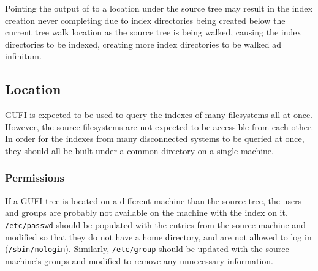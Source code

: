 Pointing the output of \gufidirindex to a location under the source
tree may result in the index creation never completing due to index
directories being created below the current tree walk location as the
source tree is being walked, causing the index directories to be
indexed, creating more index directories to be walked ad infinitum.




\subsection{Location}
GUFI is expected to be used to query the indexes of many filesystems
all at once. However, the source filesystems are not expected to be
accessible from each other. In order for the indexes from many
disconnected systems to be queried at once, they should all be built
under a common directory on a single machine.

\subsubsection{Permissions}
If a GUFI tree is located on a different machine than the source
tree, the users and groups are probably not available on the machine
with the index on it. \texttt{/etc/passwd} should be populated with
the entries from the source machine and modified so that they do not
have a home directory, and are not allowed to log in
(\texttt{/sbin/nologin}). Similarly, \texttt{/etc/group} should be
updated with the source machine's groups and modified to remove any
unnecessary information.

